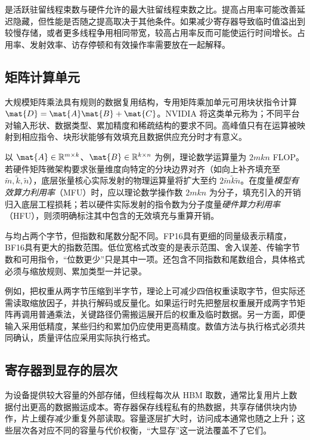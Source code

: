 \documentclass[../textbook.tex]{subfiles}
\begin{document}
是活跃驻留线程束数与硬件允许的最大驻留线程束数之比。提高占用率可能改善延迟隐藏，但性能是否随之提高取决于其他条件。如果减少寄存器导致临时值溢出到较慢存储，或者更多线程争用相同带宽，较高占用率反而可能使运行时间增长。占用率、发射效率、访存停顿和有效操作率需要放在一起解释。

\subsection{矩阵计算单元}
大规模矩阵乘法具有规则的数据复用结构，专用矩阵乘加单元可用块状指令计算 $\mat{D}=\mat{A}\mat{B}+\mat{C}$。NVIDIA 将这类单元称为；不同平台对输入形状、数据类型、累加精度和稀疏结构的要求不同。高峰值只有在运算被映射到相应指令、块形状能够有效填充且数据供应充分时才有意义。

以 $\mat{A}\in\mathbb R^{m\times k}$、$\mat{B}\in\mathbb R^{k\times n}$ 为例，理论数学运算量为 $2mkn$ FLOP。若硬件矩阵微架构要求张量维度向特定的分块边界对齐（如向上补齐填充至 $\widetilde m,\widetilde k,\widetilde n$），底层张量核心实际发射的物理运算量将扩大至约 $2\widetilde m\widetilde k\widetilde n$。在度量\emph{模型有效算力利用率}（MFU）时，应以理论数学操作数 $2mkn$ 为分子，填充引入的开销归入底层工程损耗；若以硬件实际发射的指令数为分子度量\emph{硬件算力利用率}（HFU），则须明确标注其中包含的无效填充与重算开销。

与均占两个字节，但指数和尾数分配不同。FP16具有更细的同量级表示精度，BF16具有更大的指数范围。低位宽格式改变的是表示范围、舍入误差、传输字节数和可用指令，“位数更少”只是其中一项。还包含不同指数和尾数组合，具体格式必须与缩放规则、累加类型一并记录。

例如，把权重从两字节压缩到半字节，理论上可减少四倍权重读取字节，但实际还需读取缩放因子，并执行解码或反量化。如果运行时先把整层权重展开成两字节矩阵再调用普通乘法，关键路径仍需搬运展开后的权重及临时数据。另一方面，即便输入采用低精度，某些归约和累加仍应使用更高精度。数值方法与执行格式必须共同确认，质量评估应采用实际执行格式。

\subsection{寄存器到显存的层次}
为设备提供较大容量的外部存储，但线程每次从 HBM 取数，通常比复用片上数据付出更高的数据搬运成本。寄存器保存线程私有的热数据，共享存储供块内协作，片上缓存减少重复外部读取。容量逐层扩大时，访问成本通常也随之上升；这些层次各对应不同的容量与代价权衡，“大显存”这一说法覆盖不了它们。
\end{document}

